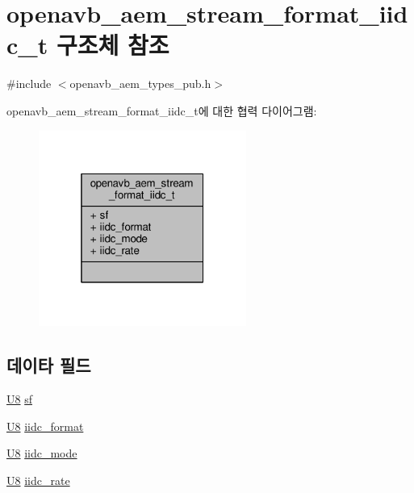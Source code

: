 \hypertarget{structopenavb__aem__stream__format__iidc__t}{}\section{openavb\+\_\+aem\+\_\+stream\+\_\+format\+\_\+iidc\+\_\+t 구조체 참조}
\label{structopenavb__aem__stream__format__iidc__t}


{\ttfamily \#include $<$openavb\+\_\+aem\+\_\+types\+\_\+pub.\+h$>$}



openavb\+\_\+aem\+\_\+stream\+\_\+format\+\_\+iidc\+\_\+t에 대한 협력 다이어그램\+:
\nopagebreak
\begin{figure}[H]
\begin{center}
\leavevmode
\includegraphics[width=193pt]{structopenavb__aem__stream__format__iidc__t__coll__graph}
\end{center}
\end{figure}
\subsection*{데이타 필드}
\begin{DoxyCompactItemize}
\item 
\hyperlink{openavb__types__base__pub_8h_aa63ef7b996d5487ce35a5a66601f3e73}{U8} \hyperlink{structopenavb__aem__stream__format__iidc__t_a153db177c2b7653917dff143e5f755e1}{sf}
\item 
\hyperlink{openavb__types__base__pub_8h_aa63ef7b996d5487ce35a5a66601f3e73}{U8} \hyperlink{structopenavb__aem__stream__format__iidc__t_a1e651446938272f0a47927ca4c86e72e}{iidc\+\_\+format}
\item 
\hyperlink{openavb__types__base__pub_8h_aa63ef7b996d5487ce35a5a66601f3e73}{U8} \hyperlink{structopenavb__aem__stream__format__iidc__t_a4ff0251cf399e420df7acefa2a7e2e8c}{iidc\+\_\+mode}
\item 
\hyperlink{openavb__types__base__pub_8h_aa63ef7b996d5487ce35a5a66601f3e73}{U8} \hyperlink{structopenavb__aem__stream__format__iidc__t_afe01b72c3b5ddc6660fc7f6a11b9c845}{iidc\+\_\+rate}
\end{DoxyCompactItemize}


